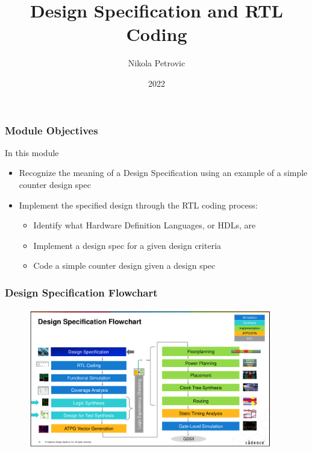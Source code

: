 \documentclass[t]{beamer}
\title{Design Specification and RTL Coding}
\author{Nikola Petrovic}
\institute{University of Belgrade, School of Electrical Engineering}
\date{2022}
\begin{document}
\frame{\titlepage}

\begin{frame}
\frametitle{Module Objectives}

In this module
\begin{itemize}
\item Recognize the meaning of a Design Specification using an example of a simple counter design spec
\item Implement the specified design through the RTL coding process:
\begin{itemize}
	\item Identify what Hardware Definition Languages, or HDLs, are
	\item Implement a design spec for a given design criteria
	\item Code a simple counter design given a design spec
\end{itemize}
\end{itemize}
\end{frame}

\begin{frame}
\frametitle{Design Specification Flowchart}

\begin{figure}
\centering
    \includegraphics[width=0.95\textwidth]{map.png}
    \label{fig:map}
\end{figure}
\end{frame}
\end{document}

